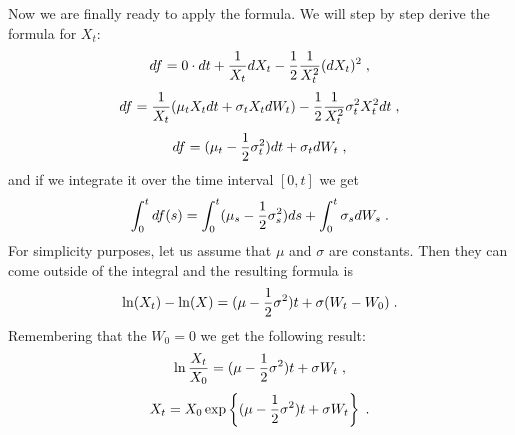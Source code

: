\documentclass[times, utf8, diplomski]{fer}
\begin{document}
\noindent Now we are finally ready to apply the formula. We will step by step derive the formula for $X_t$:
\begin{equation*}
	df = 0\cdot dt + \frac{1}{X_t}dX_t - \frac{1}{2} \frac{1}{X_t^2}(dX_t)^2 \hspace{0.1cm},
\end{equation*}
\begin{equation*}
	df = \frac{1}{X_t} (\mu_t X_t dt + \sigma_t X_t dW_t) - \frac{1}{2}\frac{1}{X_t^2}\sigma_t^2 X_t^2 dt \hspace{0.1cm},
\end{equation*}
\begin{equation}
	df = (\mu_t - \frac{1}{2}\sigma_t^2)dt + \sigma_t dW_t \hspace{0.1cm},
\end{equation}
and if we integrate it over the time interval $[0,t]$ we get
\begin{equation}
	\int_0^t df(s) = \int_0^t (\mu_s - \frac{1}{2}\sigma_s^2) ds + \int_0^t \sigma_s dW_s \hspace{0.1cm}.
\end{equation}
For simplicity purposes, let us assume that $\mu$ and $\sigma$ are constants. Then they can come outside of the integral and the resulting formula is
\begin{equation}
	\ln(X_t) - \ln(X) = (\mu-\frac{1}{2}\sigma^2)t + \sigma (W_t - W_0) \hspace{0.1cm}.
\end{equation}
Remembering that the $W_0 = 0$ we get the following result:
\begin{equation*}
	\ln\frac{X_t}{X_0} = (\mu-\frac{1}{2}\sigma^2)t + \sigma W_t \hspace{0.1cm},
\end{equation*}
\begin{equation} \label{eqn_gbm}
	X_t = X_0\exp\left\{ (\mu-\frac{1}{2}\sigma^2)t + \sigma W_t \right\} \hspace{0.1cm}.
\end{equation}
\end{document}
